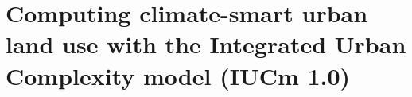 
\chapter{Computing climate-smart urban land use with the Integrated Urban Complexity model (IUCm 1.0)} %

\label{chp:iucm} %

